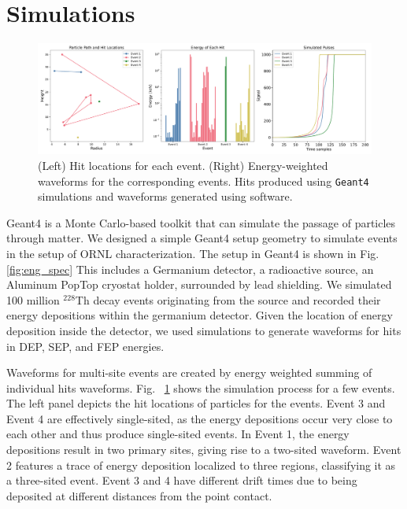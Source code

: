 \section{Simulations}


\begin{figure}[htb!]
    \includegraphics[width=0.99\linewidth,trim={1pc 0pc 1pc 0pc},clip]{ch7/figs/hit_sims.pdf}
    \caption{(Left) Hit locations for each event. (Right) Energy-weighted waveforms for the corresponding events. Hits produced using \texttt{Geant4} simulations and waveforms generated using {\siggen} software.}
   \label{fig:eng_dep_sim}
\end{figure}


Geant4 is a Monte Carlo-based toolkit that can simulate the passage of particles through matter. We designed a simple Geant4 setup geometry to simulate events in the setup of ORNL characterization. The setup in Geant4 is shown in Fig. \ref{fig:eng_spec} This includes a Germanium detector, a radioactive source, an Aluminum PopTop cryostat holder, surrounded by lead shielding. We simulated 100 million $^{228}$Th decay events originating from the source and recorded their energy depositions within the germanium detector. Given the location of energy deposition inside the detector, we used {\siggen} simulations to generate waveforms for hits in DEP, SEP, and FEP energies.


Waveforms for multi-site events are created by energy weighted summing of individual hits waveforms. Fig. ~\ref{fig:eng_dep_sim} shows the simulation process for a few events. The left panel depicts the hit locations of particles for the events. Event 3 and Event 4 are effectively single-sited, as the energy depositions occur very close to each other and thus produce single-sited events. In Event 1, the energy depositions result in two primary sites, giving rise to a two-sited waveform. Event 2 features a trace of energy deposition localized to three regions, classifying it as a three-sited event. Event 3 and 4 have different drift times due to being deposited at different distances from the point contact.

